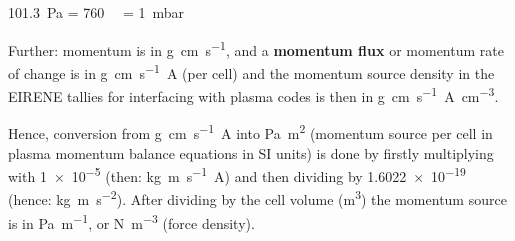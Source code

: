 \SI{101.3}{\pascal} = \SI{760}{\milli\torr} = \SI{1}{\milli\bar}

Further: momentum is in \si{\gram\centi\metre\per\second}, and a
\textbf{momentum flux} or momentum rate of change is in
\si{\gram\centi\metre\per\second\ampere} (per cell) and the momentum source
density in the EIRENE tallies for interfacing with plasma codes is then in
\si{\gram\centi\metre\per\second\ampere\per\cubic\centi\metre}.

Hence, conversion from \si{\gram\centi\metre\per\second\ampere} into
\si{\pascal\square\metre} (momentum source per cell in plasma momentum balance
equations in SI units) is done by firstly multiplying with \num{1e-5} (then:
\si{\kilo\gram\metre\per\second\ampere}) and then dividing by \num{1.6022e-19}
(hence: \si{\kilo\gram\metre\per\square\second}).
After dividing by the cell volume (\si{\cubic\metre}) the momentum source is in
\si{\pascal\per\metre}, or \si{\newton\per\cubic\metre} (force density).

\medskip

